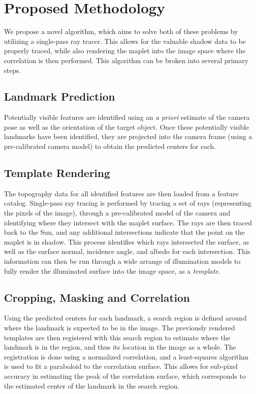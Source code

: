 \documentclass{RPI-SIW}
\begin{document}
\section*{Proposed Methodology}
We propose a novel algorithm, which aims to solve both of these problems by utilizing a single-pass ray tracer.  This allows for the valuable shadow data to be properly traced, while also rendering the maplet into the image space where the correlation is then performed.  This algorithm can be broken into several primary steps.

\subsection*{Landmark Prediction}
Potentially visible features are identified using an \textit{a priori} estimate of the camera pose as well as the orientation of the target object. Once these potentially visible landmarks have been identified, they are projected into the camera frame (using a pre-calibrated camera model) to obtain the predicted centers for each.  

\subsection*{Template Rendering}
The topography data for all identified features are then loaded from a feature catalog.  Single-pass ray tracing is performed by tracing a set of rays (representing the pixels of the image), through a pre-calibrated model of the camera and identifying where they intersect with the maplet surface.  The rays are then traced back to the Sun, and any additional intersections indicate that the point on the maplet is in shadow.  This process identifies which rays intersected the surface, as well as the surface normal, incidence angle, and albedo for each intersection.  This information can then be run through a wide arrange of illumination models to fully render the illuminated surface into the image space, as a \textit{template}.


\subsection*{Cropping, Masking and Correlation}
Using the predicted centers for each landmark, a search region is defined around where the landmark is expected to be in the image.  The previously rendered templates are then registered with this search region to estimate where the landmark is in the region, and thus its location in the image as a whole.  The registration is done using a normalized correlation, and a least-squares algorithm is used to fit a paraboloid to the correlation surface.  This allows for sub-pixel accuracy in estimating the peak of the correlation surface, which corresponds to the estimated center of the landmark in the search region.
\end{document}
